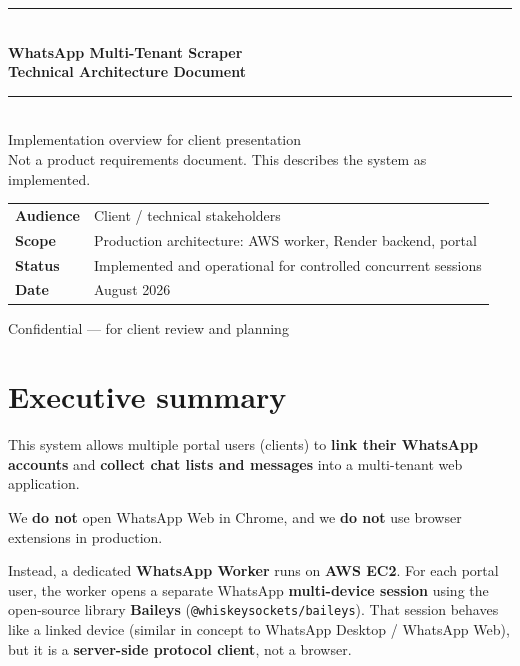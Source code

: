 \documentclass[11pt,a4paper]{article}
\begin{document}
\begin{titlepage}
\centering
\vspace*{1.6cm}
{\color{brand}\rule{\textwidth}{2.2pt}}\\[10pt]
{\LARGE\bfseries\color{brand} WhatsApp Multi-Tenant Scraper}\\[10pt]
{\Huge\bfseries Technical Architecture Document}\\[8pt]
{\color{brand}\rule{\textwidth}{0.8pt}}\\[1.4cm]
{\large Implementation overview for client presentation}\\[0.5cm]
{\normalsize Not a product requirements document. This describes the system as implemented.}\\[2.2cm]

\begin{tabular}{@{}ll@{}}
\textbf{Audience} & Client / technical stakeholders \\[4pt]
\textbf{Scope} & Production architecture: AWS worker, Render backend, portal \\[4pt]
\textbf{Status} & Implemented and operational for controlled concurrent sessions \\[4pt]
\textbf{Date} & August 2026 \\
\end{tabular}

\vfill
{\small Confidential --- for client review and planning}
\end{titlepage}

\tableofcontents
\newpage

\section{Executive summary}

This system allows multiple portal users (clients) to \textbf{link their WhatsApp accounts} and \textbf{collect chat lists and messages} into a multi-tenant web application.

We \textbf{do not} open WhatsApp Web in Chrome, and we \textbf{do not} use browser extensions in production.

Instead, a dedicated \textbf{WhatsApp Worker} runs on \textbf{AWS EC2}. For each portal user, the worker opens a separate WhatsApp \textbf{multi-device session} using the open-source library \textbf{Baileys} (\texttt{@whiskeysockets/baileys}). That session behaves like a linked device (similar in concept to WhatsApp Desktop / WhatsApp Web), but it is a \textbf{server-side protocol client}, not a browser.
\end{document}
